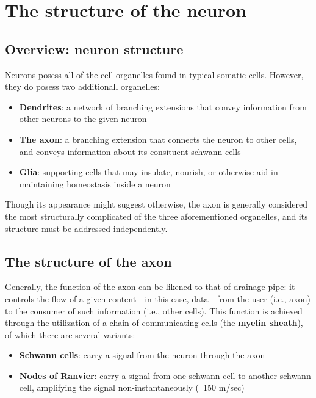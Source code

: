 \documentclass{article}
\begin{document}
\section{The structure of the neuron}

\subsection{Overview: neuron structure}

Neurons posess all of the cell organelles found in typical somatic cells.
However, they do posess two additionall organelles:

\begin{itemize}
	\item \textbf{Dendrites}: a network of branching extensions that convey
		information from other neurons to the given neuron
	\item \textbf{The axon}: a branching extension that connects the neuron to
		other cells, and conveys information about its consituent schwann
		cells
	\item \textbf{Glia}: supporting cells that may insulate, nourish, or
		otherwise aid in maintaining homeostasis inside a neuron
\end{itemize}

Though its appearance might suggest otherwise, the axon is generally considered
the most structurally complicated of the three aforementioned organelles, and
its structure must be addressed independently.

\subsection{The structure of the axon}

Generally, the function of the axon can be likened to that of drainage pipe:
it controls the flow of a given content---in this case, data---from the user
(i.e., axon) to the consumer of such information (i.e., other cells). This
function is achieved through the utilization of a chain of communicating cells
(the \textbf{myelin sheath}), of which there are several variants:

\begin{itemize}
	\item \textbf{Schwann cells}: carry a signal from the neuron through the axon
	\item \textbf{Nodes of Ranvier}: carry a signal from one schwann cell to
		another schwann cell, amplifying the signal non-instantaneously
		(~150 m/sec)
\end{itemize}
\end{document}
